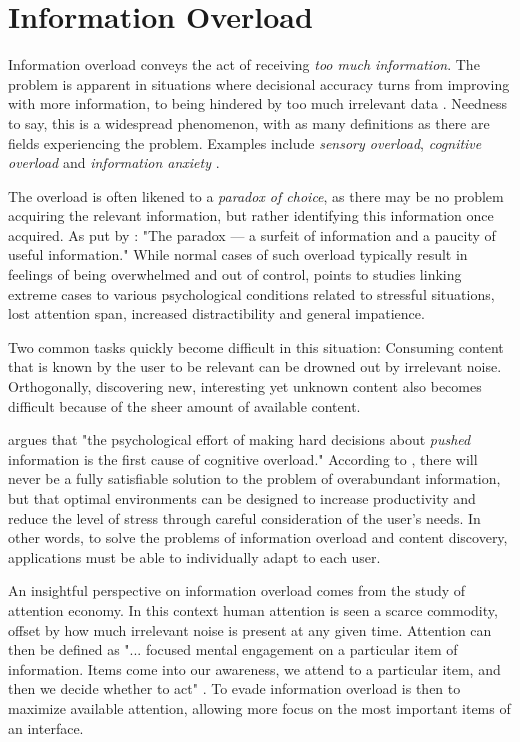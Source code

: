 \section{Information Overload}

Information overload conveys the act of receiving \emph{too much information}. 
The problem is apparent in situations where decisional accuracy turns from improving with more information, to being hindered by too much irrelevant data \cite[p13]{Bjorkoy2010d}. 
Needness to say, this is a widespread phenomenon, with as many definitions as there are fields experiencing the problem. Examples include \emph{sensory overload}, \emph{cognitive overload} and \emph{information anxiety} \citep{Eppler2004}.

The overload is often likened to a \emph{paradox of choice}, as there may be no problem acquiring the relevant information, but rather identifying this information once acquired. As put by \cite{Edmunds2000}: "The paradox --- a surfeit of information and a paucity of useful information."
While normal cases of such overload typically result in feelings of being overwhelmed and out of control, \cite{Bawden2008} points to studies linking extreme cases to various psychological conditions related to stressful situations, lost attention span, increased distractibility and general impatience.

Two common tasks quickly become difficult in this situation:
Consuming content that is known by the user to be relevant can be drowned out by irrelevant noise.
Orthogonally, discovering new, interesting yet unknown content also becomes difficult because of the sheer amount of available content.

\cite{Kirsh2000} argues that "the psychological effort of making hard decisions about \emph{pushed} information is the first cause of cognitive overload." 
According to \citeauthor{Kirsh2000}, there will never be a fully satisfiable solution to the problem of overabundant information, 
but that optimal environments can be designed to increase productivity and reduce the level of stress through careful consideration of the user's needs. 
In other words, to solve the problems of information overload and content discovery, applications must be able to individually adapt to each user. 

An insightful perspective on information overload comes from the study of attention economy. 
In this context human attention is seen a scarce commodity, offset by how much irrelevant noise is present at any given time. 
Attention can then be defined as "... focused mental engagement on a particular item of information. 
Items come into our awareness, we attend to a particular item, and then we decide whether to act" 
\citep{Davenport2001}. 
To evade information overload is then to maximize available attention, allowing more focus on the most important items of an interface.

